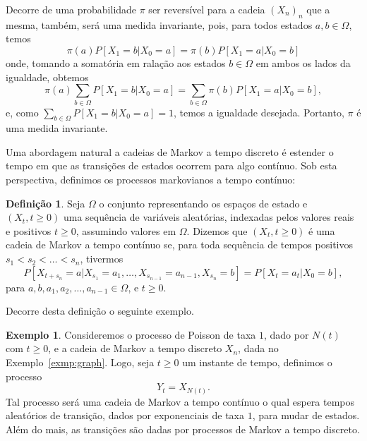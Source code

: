 \documentclass[twoside,openright,titlepage,numbers=noenddot,headinclude,  lineheaders footinclude=true,cleardoublepage=empty,
                                BCOR=5mm,paper=a4,fontsize=12pt ]{scrbook}
\theoremstyle{definition}
\newtheorem{definicao}{Definição}[chapter]
\newtheorem{exmp}{Exemplo}[section]
\begin{document}
Decorre de uma probabilidade $\pi$ ser reversível para a cadeia $(X_n)_n$ que a mesma, também, será uma medida 
invariante, pois, para todos estados $a,b \in \Omega$, temos
\[
\pi(a) P[X_1 = b| X_0 = a] = \pi(b) P[X_1 = a| X_0 = b]
\]
onde, tomando a somatória em ralação aos estados $b \in \Omega$ em ambos os lados
da igualdade, obtemos
\[
\pi(a) \sum_{b \in \Omega} P[X_1 = b| X_0 = a] = \sum_{b \in \Omega} \pi(b) P[X_1 = a| X_0 = b],
\]
e, como $\sum_{b \in \Omega} P[X_1 = b| X_0 = a] = 1$, temos a igualdade desejada. Portanto,
$\pi$ é uma medida invariante.

Uma abordagem natural a cadeias de Markov a tempo discreto é estender o tempo
em que as transições de estados ocorrem para algo contínuo. Sob esta perspectiva,
definimos os processos markovianos a tempo contínuo:
\begin{definicao}
Seja $\Omega$ o conjunto representando os espaços de estado e $(X_t, t \geq 0)$ uma sequência
de variáveis aleatórias, indexadas pelos valores reais e positivos $t \geq 0$, assumindo
valores em $\Omega$. Dizemos que $(X_t, t \geq 0)$ é uma cadeia de Markov a tempo 
contínuo se, para toda sequência de tempos positivos
$s_1 < s_2 < \ldots < s_n$, tivermos
\[
P[ X_{t + s_n} = a| X_{s_1} = a_1, \ldots, X_{s_{n-1}} = a_{n-1}, X_{s_n} = b] = P[ X_t = a_t| X_0 = b],
\]
para $a, b, a_1, a_2, \ldots, a_{n-1} \in \Omega$, e $t \geq 0$.
\end{definicao}

Decorre desta definição o seguinte exemplo.
\begin{exmp} \label{cont}
Consideremos o processo de Poisson de taxa $1$, dado por $N(t)$ com $t \geq 0$, e a cadeia
de Markov a tempo discreto $X_n$, dada no Exemplo~\ref{exmp:graph}. Logo, seja $t \geq 0$
um instante de tempo,
definimos o processo
\[
Y_t = X_{N(t)}.
\]
Tal processo será uma cadeia de Markov a tempo contínuo o qual espera tempos aleatórios de transição,
dados por exponenciais de taxa $1$, para mudar de estados. Além do mais, as transições são dadas por
processos de Markov a tempo discreto.
\end{exmp}
\end{document}
